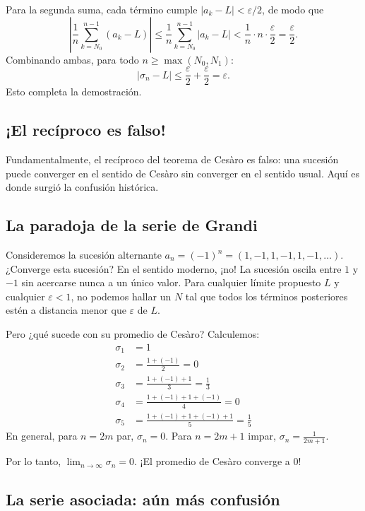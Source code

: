 Para la segunda suma, cada término cumple $|a_k - L| < \varepsilon/2$, de modo que
\[
  \left| \frac1n \sum_{k=N_0}^{n-1} (a_k - L) \right|
  \le \frac1n \sum_{k=N_0}^{n-1} |a_k - L| < \frac1n \cdot n \cdot \frac{\varepsilon}{2} = \frac{\varepsilon}{2} .
\]
Combinando ambas, para todo $n \ge \max(N_0, N_1)$:
\[
  |\sigma_n - L| \le \frac{\varepsilon}{2} + \frac{\varepsilon}{2} = \varepsilon .
\]
Esto completa la demostración.

\subsection{¡El recíproco es falso!}

Fundamentalmente, el recíproco del teorema de Cesàro es falso: una sucesión puede converger en el sentido de Cesàro sin converger en el sentido usual. Aquí es donde surgió la confusión histórica.

\subsection{La paradoja de la serie de Grandi}

Consideremos la sucesión alternante $a_n = (-1)^n = (1,-1,1,-1,1,-1,\dots)$. ¿Converge esta sucesión? En el sentido moderno, ¡no! La sucesión oscila entre $1$ y $-1$ sin acercarse nunca a un único valor. Para cualquier límite propuesto $L$ y cualquier $\varepsilon < 1$, no podemos hallar un $N$ tal que todos los términos posteriores estén a distancia menor que $\varepsilon$ de $L$.

Pero ¿qué sucede con su promedio de Cesàro? Calculemos:
\begin{align*}
  \sigma_1 &= 1\\
  \sigma_2 &= \frac{1 + (-1)}{2} = 0\\
  \sigma_3 &= \frac{1 + (-1) + 1}{3} = \frac13\\
  \sigma_4 &= \frac{1 + (-1) + 1 + (-1)}{4} = 0\\
  \sigma_5 &= \frac{1 + (-1) + 1 + (-1) + 1}{5} = \frac15
\end{align*}
En general, para $n = 2m$ par, $\sigma_n = 0$. Para $n = 2m+1$ impar, $\sigma_n = \frac{1}{2m+1}$.

Por lo tanto, $\lim_{n\to\infty} \sigma_n = 0$. ¡El promedio de Cesàro converge a $0$!

\subsection{La serie asociada: aún más confusión}

